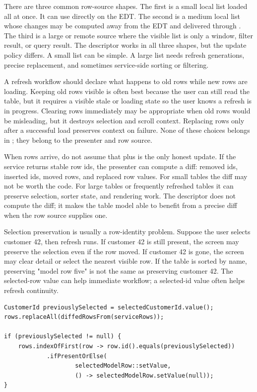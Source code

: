 There are three common row-source shapes. The first is a small local list
loaded all at once. It can use  directly on the EDT.
The second is a medium local list whose changes may be computed away from the
EDT and delivered through . The third is a large or
remote source where the visible list is only a window, filter result, or query
result. The descriptor works in all three shapes, but the update policy
differs. A small list can be simple. A large list needs refresh generations,
precise replacement, and sometimes service-side sorting or filtering.

A refresh workflow should declare what happens to old rows while new rows are
loading. Keeping old rows visible is often best because the user can still
read the table, but it requires a visible stale or loading state so the user
knows a refresh is in progress. Clearing rows immediately may be appropriate
when old rows would be misleading, but it destroys selection and scroll
context. Replacing rows only after a successful load preserves context on
failure. None of these choices belongs in ; they belong to the
presenter and row source.

When rows arrive, do not assume that  plus  is the only
honest update. If the service returns stable row ids, the presenter can compute
a diff: removed ids, inserted ids, moved rows, and replaced row values. For
small tables the diff may not be worth the code. For large tables or
frequently refreshed tables it can preserve selection, sorter state, and
rendering work. The descriptor does not compute the diff; it makes the table
model able to benefit from a precise diff when the row source supplies one.

Selection preservation is usually a row-identity problem. Suppose the user
selects customer 42, then refresh runs. If customer 42 is still present, the
screen may preserve the selection even if the row moved. If customer 42 is
gone, the screen may clear detail or select the nearest visible row. If the
table is sorted by name, preserving "model row five" is not the same as
preserving customer 42. The selected-row value can help immediate workflow;
a selected-id value often helps refresh continuity.

\begin{lstlisting}[caption={Refresh by row identity, not by old view row.}]
CustomerId previouslySelected = selectedCustomerId.value();
rows.replaceAll(diffedRowsFrom(serviceRows));

if (previouslySelected != null) {
    rows.indexOfFirst(row -> row.id().equals(previouslySelected))
            .ifPresentOrElse(
                    selectedModelRow::setValue,
                    () -> selectedModelRow.setValue(null));
}
\end{lstlisting}

